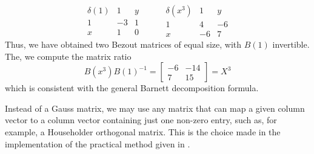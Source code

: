 \documentclass{standalone}
\begin{document}
$$
\begin{array}{c|cc}
	\delta(1) & 1 & y \\
	\hline
	1 & -3 & 1 \\
	x & 1 & 0
\end{array}
\hspace{1cm}
\begin{array}{c|cc}
	\delta(x^3) & 1 & y \\
	\hline
	1 & 4 & -6  \\
	x & -6 & 7
\end{array}
$$
Thus, we have obtained two Bezout matrices of equal size, with $B(1)$ invertible. The, we compute the matrix ratio
\begin{equation}
	B(x^3)B(1)^{-1} =
	\begin{bmatrix}
		-6 & -14 \\
		7 & 15
	\end{bmatrix}
	= X^3
\end{equation}
which is consistent with the general Barnett decomposition formula.

\begin{rem}
Instead of a Gauss matrix, we may use any matrix that can map a given column vector to a column vector containing just one non-zero entry, such as, for example, a Householder orthogonal matrix. This is the choice made in the implementation of the practical method given in \cite{jp_code}.

\end{rem}
\end{document}
